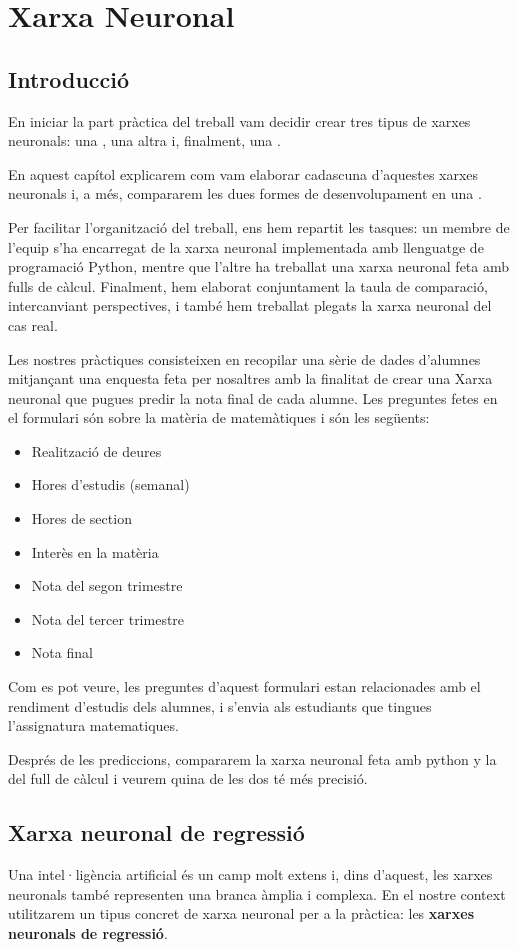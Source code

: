\chapter{Xarxa Neuronal}
\section{Introducció}
En iniciar la part pràctica del treball vam decidir crear tres tipus de xarxes neuronals: una , una altra  i, finalment, una .

En aquest capítol explicarem com vam elaborar cadascuna d’aquestes xarxes neuronals i, a més, compararem les dues formes de desenvolupament en una .

Per facilitar l’organització del treball, ens hem repartit les tasques: un membre de l’equip s’ha encarregat de la xarxa neuronal implementada amb llenguatge de programació Python, mentre que l’altre ha treballat una xarxa neuronal feta amb fulls de càlcul. Finalment, hem elaborat conjuntament la taula de comparació, intercanviant perspectives, i també hem treballat plegats la xarxa neuronal del cas real.

Les nostres pràctiques consisteixen en recopilar una sèrie de dades d'alumnes mitjançant una enquesta feta per nosaltres amb la finalitat de crear una Xarxa neuronal que pugues predir la nota final de cada alumne. Les preguntes fetes en el formulari són sobre la matèria de matemàtiques i són les següents:
\begin{itemize}
 \item Realització de deures
 \item Hores d'estudis (semanal)
 \item Hores de section
 \item Interès en la matèria
 \item Nota del segon trimestre
 \item Nota del tercer trimestre
 \item Nota final
\end{itemize}
Com es pot veure, les preguntes d'aquest formulari estan relacionades amb el rendiment d'estudis dels alumnes, i s'envia als estudiants que tingues l'assignatura matematiques.


Després de les prediccions, compararem la xarxa neuronal feta amb python y la del full de càlcul i veurem quina de les dos té més precisió.

\section{Xarxa neuronal de regressió}\label{sec:op}
Una intel·ligència artificial és un camp molt extens i, dins d’aquest, les xarxes neuronals també representen una branca àmplia i complexa.
En el nostre context utilitzarem un tipus concret de xarxa neuronal per a la pràctica: les \textbf{xarxes neuronals de regressió}.

